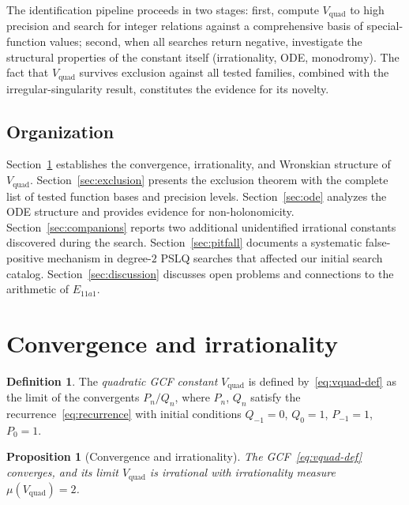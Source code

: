 \documentclass[11pt,a4paper]{article}
\newtheorem{proposition}[theorem]{Proposition}
\theoremstyle{definition}
\newtheorem{definition}[theorem]{Definition}
\theoremstyle{remark}
\newcommand{\Vq}{V_{\mathrm{quad}}}
\begin{document}
The identification pipeline proceeds in two stages: first, compute
$\Vq$ to high precision and search for integer relations against a
comprehensive basis of special-function values; second, when all
searches return negative, investigate the structural properties of
the constant itself (irrationality, ODE, monodromy).  The fact that
$\Vq$ survives exclusion against all tested families, combined with
the irregular-singularity result, constitutes the evidence for its
novelty.


\subsection{Organization}

Section~\ref{sec:convergence} establishes the convergence, irrationality,
and Wronskian structure of $\Vq$.
Section~\ref{sec:exclusion} presents the exclusion theorem with the
complete list of tested function bases and precision levels.
Section~\ref{sec:ode} analyzes the ODE structure and provides
evidence for non-holonomicity.
Section~\ref{sec:companions} reports two additional unidentified
irrational constants discovered during the search.
Section~\ref{sec:pitfall} documents a systematic false-positive
mechanism in degree-$2$ PSLQ searches that affected our initial
search catalog.
Section~\ref{sec:discussion} discusses open problems and connections
to the arithmetic of $E_{11a1}$.


\section{Convergence and irrationality}\label{sec:convergence}

\begin{definition}
The \emph{quadratic GCF constant} $\Vq$ is defined by~\eqref{eq:vquad-def}
as the limit of the convergents $P_n / Q_n$, where $P_n$, $Q_n$
satisfy the recurrence~\eqref{eq:recurrence} with initial conditions
$Q_{-1} = 0$, $Q_0 = 1$, $P_{-1} = 1$, $P_0 = 1$.
\end{definition}

\begin{proposition}[Convergence and irrationality]\label{prop:irrationality}
The GCF~\eqref{eq:vquad-def} converges, and its limit $\Vq$ is
irrational with irrationality measure $\mu(\Vq) = 2$.
\end{proposition}
\end{document}
